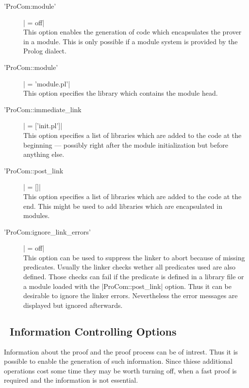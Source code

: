 \begin{description}
\item ['ProCom:module'] | = off|
  \\
  This option enables the generation of code which encapsulates the prover in
  a module. This is only possible if a module system is provided by the Prolog
  dialect.

\item ['ProCom::module'] | = 'module.pl'|
  \\
  This option specifies the library which contains the module head.

\item ['ProCom::immediate\_link] | = ['init.pl']|%
  \label{opt:ProCom::immediate_link}\\
  This option specifies a list of libraries which are added to the code
  at the beginning --- possibly right after the module initialization but
  before anything else.

\item ['ProCom::post\_link] | = []|
  \\
  This option specifies a list of libraries which are added to the code at the
  end. This might be used to add libraries which are encapsulated in modules.

\item ['ProCom:ignore\_link\_errors'] | = off|
  \\
  This option can be used to suppress the linker to abort because of missing
  predicates. Usually the linker checks wether all predicates used are also
  defined. Those checks can fail if the predicate is defined in a library file
  or a module loaded with the |ProCom::post_link| option. Thus it can be
  desirable to ignore the linker errors. Nevertheless the error messages are
  displayed but ignored afterwards.
\end{description}

\subsection{\ProCom\ Information Controlling Options}

Information about the proof and the proof process can be of intrest. Thus it
is possible to enable the generation of such information. Since thiese
additional operations cost some time they may be worth turning off, when a
fast proof is required and the information is not essential.

